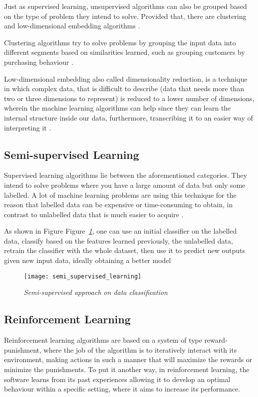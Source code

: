 Just as supervised learning, unsupervised algorithms can also be grouped
based on the type of problem they intend to solve. Provided that,
there are clustering and low-dimensional embedding algorithms \cite{amai}.

Clustering algorithms try to solve problems by grouping the input data
into different segments based on similarities learned,
such as grouping customers by purchasing behaviour \cite{brownlee2016master}.


Low-dimensional embedding also called dimensionality reduction,
is a technique in which complex data, that is difficult to describe
(data that needs more than two or three dimensions to represent)
is reduced to a lower number of dimensions,
wherein the machine learning algorithms can help
since they can learn the internal structure inside our data, furthermore,
transcribing it to an easier way of interpreting it \cite{amai}.


\subsection{Semi-supervised Learning}
Supervised learning algorithms lie between the aforementioned categories.
They intend to solve problems where you have a large amount of data but only some labelled.
A lot of machine learning problems are using this technique for the reason that
labelled data can be expensive or time-consuming to obtain,
in contrast to unlabelled data that is much easier to acquire \cite{brownlee2016master}.

As shown in Figure Figure\emph{~\ref{fig:semi_supervised_learning}}, one can use an initial classifier on the labelled data,
classify based on the features learned previously, the unlabelled data,
retrain the classifier with the whole dataset,
then use it to predict new outputs given new input data, ideally obtaining a better model \cite{lotte2015}

\begin{figure}[h]
    \centering
    \texttt{[image: semi\_supervised\_learning]}
    \caption{\emph{Semi-supervised approach on data classification \cite{lotte2015}}}
    \label{fig:semi_supervised_learning}
\end{figure}

\subsection{Reinforcement Learning}
Reinforcement learning algorithms are based on a system of type reward-punishment,
where the job of the algorithm is to iteratively interact with its environment,
making actions in such a manner that will maximize the rewards or minimize the punishments.
To put it another way, in reinforcement learning,
the software learns from its past experiences allowing it to develop an optimal
behaviour within a specific setting, where it aims to increase its performance.

